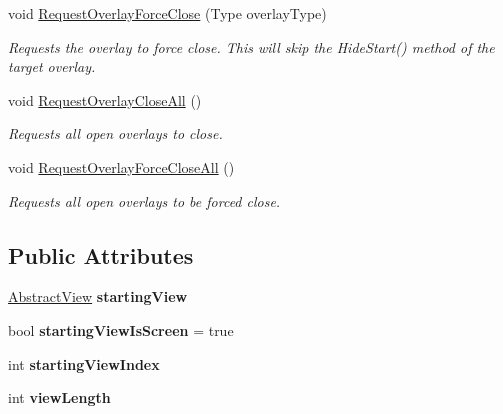 \begin{DoxyCompactItemize}
void \hyperlink{class_scaffolding_1_1_view_manager_aabb569944b16f76150d38ecabc5b9b7d}{Request\-Overlay\-Force\-Close} (Type overlay\-Type)
\begin{DoxyCompactList}\small\item\em Requests the overlay to force close. This will skip the Hide\-Start() method of the target overlay. \end{DoxyCompactList}\item 
void \hyperlink{class_scaffolding_1_1_view_manager_a499bfe5132ab7546d40667dbded6b3fe}{Request\-Overlay\-Close\-All} ()
\begin{DoxyCompactList}\small\item\em Requests all open overlays to close. \end{DoxyCompactList}\item 
void \hyperlink{class_scaffolding_1_1_view_manager_aec7560a6b7c91c50e7e39e1edbf622ea}{Request\-Overlay\-Force\-Close\-All} ()
\begin{DoxyCompactList}\small\item\em Requests all open overlays to be forced close. \end{DoxyCompactList}\end{DoxyCompactItemize}
\subsection*{Public Attributes}
\begin{DoxyCompactItemize}
\item 
\hypertarget{class_scaffolding_1_1_view_manager_abc9825e89be3fddca59c392ba338a8db}{\hyperlink{class_scaffolding_1_1_abstract_view}{Abstract\-View} {\bfseries starting\-View}}\label{class_scaffolding_1_1_view_manager_abc9825e89be3fddca59c392ba338a8db}

\item 
\hypertarget{class_scaffolding_1_1_view_manager_a7685f71898184419cedb57f3e25f59a1}{bool {\bfseries starting\-View\-Is\-Screen} = true}\label{class_scaffolding_1_1_view_manager_a7685f71898184419cedb57f3e25f59a1}

\item 
\hypertarget{class_scaffolding_1_1_view_manager_a9e56eb550c23c91a256fe35da7636e82}{int {\bfseries starting\-View\-Index}}\label{class_scaffolding_1_1_view_manager_a9e56eb550c23c91a256fe35da7636e82}

\item 
\hypertarget{class_scaffolding_1_1_view_manager_a7c9fb93b9a870283b29774b884d001e1}{int {\bfseries view\-Length}}\label{class_scaffolding_1_1_view_manager_a7c9fb93b9a870283b29774b884d001e1}

\end{DoxyCompactItemize}
